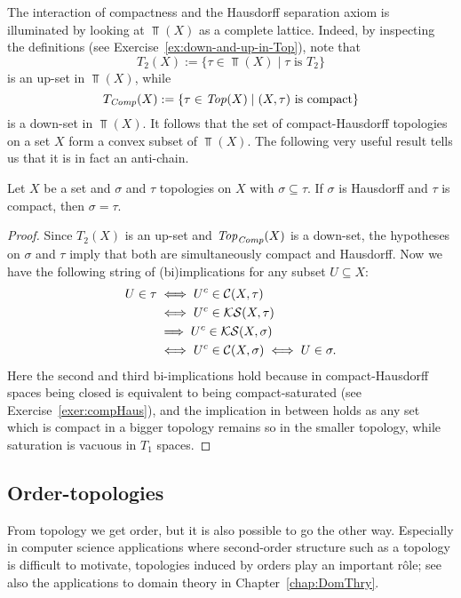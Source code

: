 The interaction of compactness and the Hausdorff separation axiom is illuminated by looking at $\Top(X)$ as a complete lattice. Indeed, by inspecting the definitions (see Exercise~\ref{ex:down-and-up-in-Top}), note that
\[
T_2(X):=\{\tau\in\Top(X)\mid \tau \text{ is } T_2\}
\]
is an up-set in $\Top(X)$, while
\[
T_{\it Comp}(X):=\{\tau\in\mathit{Top}(X)\mid (X,\tau) \text{ is compact}\}
\]
is a down-set in $\Top(X)$. It follows that the set of compact-Hausdorff topologies on a set $X$ form a convex subset of $\Top(X)$. The following very useful result tells us that it is in fact an anti-chain.

\begin{proposition}\label{prop:compHaus-incomp}
Let $X$ be a set and $\sigma$ and $\tau$ topologies on $X$ with $\sigma\subseteq\tau$. If $\sigma$ is Hausdorff and $\tau$ is compact, then $\sigma=\tau$.
\end{proposition}

\begin{proof}
Since $T_2(X)$ is an up-set and $\mathit{Top}_{\it Comp}(X)$ is a down-set, the hypotheses on $\sigma$ and $\tau$ imply that both are simultaneously compact and Hausdorff. Now we have the following string of (bi)implications for any subset $U\subseteq X$:
\begin{align*}
U\in\tau  &\iff U^c\in \mathcal{C}(X,\tau)\\
               & \iff U^c\in \mathcal{KS}(X,\tau) \\
               & \implies U^c\in \mathcal{KS}(X,\sigma)\\
               & \iff U^c\in \mathcal{C}(X,\sigma)\iff U\in\sigma.
\end{align*}
Here the second and third bi-implications hold because in compact-Hausdorff spaces being closed is equivalent to being compact-saturated (see Exercise~\ref{exer:compHaus}), and the implication in between holds as any set which is compact in a bigger topology remains so in the smaller topology, while saturation is vacuous in $T_1$ spaces.
\end{proof}

\subsection*{Order-topologies}
From topology we get order, but it is also possible to go the other way. Especially in computer science applications where second-order structure such as a topology is difficult to motivate, topologies induced by orders play an important r\^ ole; see also the applications to domain theory in Chapter~\ref{chap:DomThry}.

